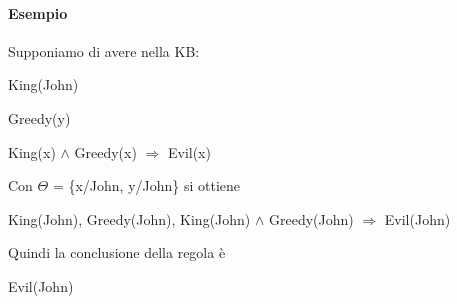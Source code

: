 \documentclass[10pt]{book}
\begin{document}
\paragraph{Esempio} Supponiamo di avere nella KB:
\begin{list}{}{}
	\item King(John)
	\item Greedy(y)
	\item King(x) $\wedge$ Greedy(x) $\Rightarrow$ Evil(x)
\end{list}
Con $\Theta$ = \{x/John, y/John\} si ottiene
\begin{list}{}{}
	\item King(John), Greedy(John), King(John) $\wedge$ Greedy(John) $\Rightarrow$ Evil(John)
\end{list}
Quindi la conclusione della regola è 
\begin{list}{}{}
	\item Evil(John)
\end{list}
\end{document}
